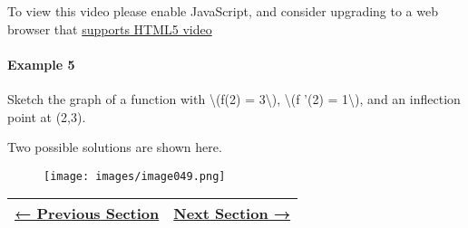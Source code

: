 To view this video please enable JavaScript, and consider upgrading to a
web browser that \href{http://videojs.com/html5-video-support/}{supports
HTML5 video}

\hypertarget{example-5}{%
\paragraph{Example 5}\label{example-5}}

Sketch the graph of a function with \textbackslash{}(f(2) =
3\textbackslash{}), \textbackslash{}(f '(2) = 1\textbackslash{}), and an
inflection point at (2,3).

Two possible solutions are shown here.

\begin{figure}
\centering
\texttt{[image: images/image049.png]}
\caption{}
\end{figure}

\begin{longtable}[]{@{}ll@{}}
\toprule
\endhead
\href{section2-5.php}{← Previous Section} & \href{section2-7.php}{Next
Section →}\tabularnewline
\bottomrule
\end{longtable}
